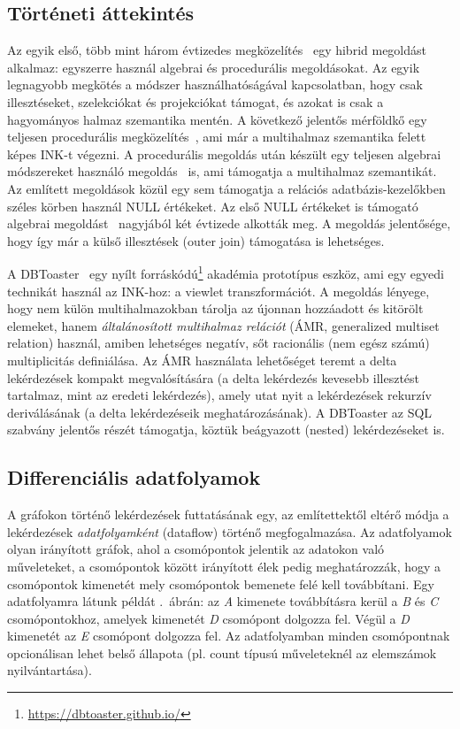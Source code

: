 \subsection{Történeti áttekintés}
Az egyik első, több mint három évtizedes megközelítés~\cite{DBLP:conf/sigmod/BlakeleyLT86} egy hibrid megoldást alkalmaz: egyszerre használ algebrai és procedurális megoldásokat. Az egyik legnagyobb megkötés a módszer használhatóságával kapcsolatban, hogy csak illesztéseket, szelekciókat és projekciókat támogat, és azokat is csak a hagyományos halmaz szemantika mentén.
A következő jelentős mérföldkő egy teljesen procedurális megközelítés~\cite{DBLP:conf/sigmod/GuptaMS93}, ami már a multihalmaz szemantika felett képes INK-t végezni. A procedurális megoldás után készült egy teljesen algebrai módszereket használó megoldás~\cite{DBLP:conf/sigmod/ColbyGLMT96} is, ami támogatja a multihalmaz szemantikát. Az említett megoldások közül egy sem támogatja a relációs adatbázis-kezelőkben széles körben használ NULL értékeket. Az első NULL értékeket is támogató algebrai megoldást~\cite{DBLP:journals/sigmod/GriffinK98} nagyjából két évtizede alkották meg. A megoldás jelentősége, hogy így már a külső illesztések (outer join) támogatása is lehetséges.

A DBToaster~\cite{DBLP:journals/vldb/KochAKNNLS14} egy nyílt forráskódú\footnote{\url{https://dbtoaster.github.io/}} akadémia prototípus eszköz, ami egy egyedi technikát használ az INK-hoz: a viewlet transzformációt. A megoldás lényege, hogy nem külön multihalmazokban tárolja az újonnan hozzáadott és kitörölt elemeket, hanem \emph{általánosított multihalmaz relációt} (ÁMR, generalized multiset relation) használ, amiben lehetséges negatív, sőt racionális (nem egész számú) multiplicitás definiálása. Az ÁMR használata lehetőséget teremt a delta lekérdezések kompakt megvalósítására (a delta lekérdezés kevesebb illesztést tartalmaz, mint az eredeti lekérdezés), amely utat nyit a lekérdezések rekurzív deriválásának (a delta lekérdezéseik meghatározásának). A DBToaster az SQL szabvány jelentős részét támogatja, köztük beágyazott (nested) lekérdezéseket is.

\subsection{Differenciális adatfolyamok}
A gráfokon történő lekérdezések futtatásának egy, az említettektől eltérő módja a lekérdezések \emph{adatfolyamként} (dataflow) történő megfogalmazása. Az adatfolyamok olyan irányított gráfok, ahol a csomópontok jelentik az adatokon való műveleteket, a csomópontok között irányított élek pedig meghatározzák, hogy a csomópontok kimenetét mely csomópontok bemenete felé kell továbbítani. Egy adatfolyamra látunk példát .~ábrán: az \textit{A} kimenete továbbításra kerül a \textit{B} és \textit{C} csomópontokhoz, amelyek kimenetét \textit{D} csomópont dolgozza fel. Végül a \textit{D} kimenetét az \textit{E} csomópont dolgozza fel. Az adatfolyamban minden csomópontnak opcionálisan lehet belső állapota (pl. count típusú műveleteknél az elemszámok nyilvántartása). 

